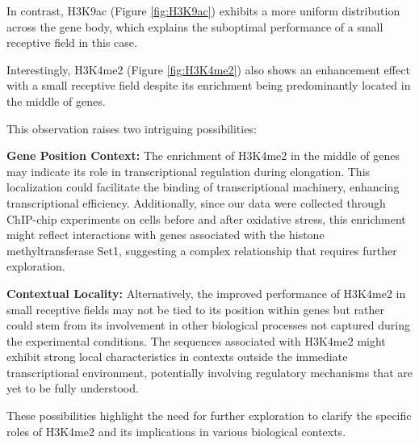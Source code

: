 In contrast, H3K9ac (Figure  \ref{fig:H3K9ac}) exhibits a more uniform distribution across the gene body, which explains the suboptimal performance of a small receptive field in this case.

Interestingly, H3K4me2 (Figure  \ref{fig:H3K4me2}) also shows an enhancement effect with a small receptive field despite its enrichment being predominantly located in the middle of genes.



This observation raises two intriguing possibilities:

\textbf{Gene Position Context:} The enrichment of H3K4me2 in the middle of genes may indicate its role in transcriptional regulation during elongation. This localization could facilitate the binding of transcriptional machinery, enhancing transcriptional efficiency. Additionally, since our data were collected through ChIP-chip experiments on cells before and after oxidative stress, this enrichment might reflect interactions with genes associated with the histone methyltransferase Set1, suggesting a complex relationship that requires further exploration.

\textbf{Contextual Locality:} Alternatively, the improved performance of H3K4me2 in small receptive fields may not be tied to its position within genes but rather could stem from its involvement in other biological processes not captured during the experimental conditions. The sequences associated with H3K4me2 might exhibit strong local characteristics in contexts outside the immediate transcriptional environment, potentially involving regulatory mechanisms that are yet to be fully understood.

These possibilities highlight the need for further exploration to clarify the specific roles of H3K4me2 and its implications in various biological contexts.